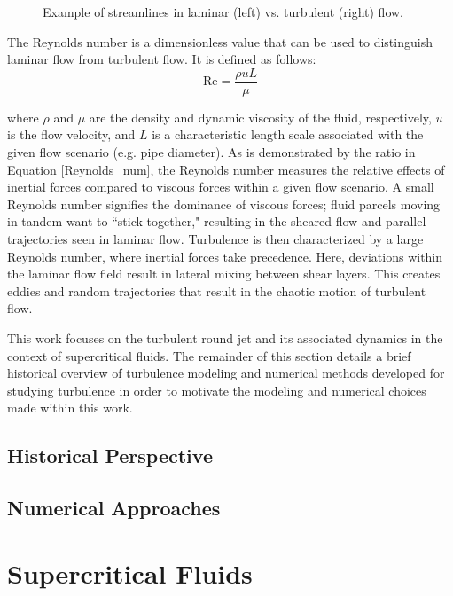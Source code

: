 \begin{figure}[h!]
\begin{center}
\end{center}
\caption{Example of streamlines in laminar (left) vs. turbulent (right) flow.}
\label{lam_vs_turb}
\end{figure}

The Reynolds number is a dimensionless value that can be used to distinguish laminar flow from turbulent flow. It is defined as follows:
\begin{equation}
\label{Reynolds_num}
\text{Re} = \frac{\rho u L}{\mu}
\end{equation}

\noindent where $\rho$ and $\mu$ are the density and dynamic viscosity of the fluid, respectively, $u$ is the flow velocity, and $L$ is a characteristic length scale associated with the given flow scenario (e.g. pipe diameter). As is demonstrated by the ratio in Equation \ref{Reynolds_num}, the Reynolds number measures the relative effects of inertial forces compared to viscous forces within a given flow scenario. A small Reynolds number signifies the dominance of viscous forces; fluid parcels moving in tandem want to ``stick together," resulting in the sheared flow and parallel trajectories seen in laminar flow. Turbulence is then characterized by a large Reynolds number, where inertial forces take precedence. Here, deviations within the laminar flow field result in lateral mixing between shear layers. This creates eddies and random trajectories that result in the chaotic motion of turbulent flow. 

This work focuses on the turbulent round jet and its associated dynamics in the context of supercritical fluids. The remainder of this section details a brief historical overview of turbulence modeling and numerical methods developed for studying turbulence in order to motivate the modeling and numerical choices made within this work.

\subsection{Historical Perspective}


\subsection{Numerical Approaches}


\section{Supercritical Fluids}

